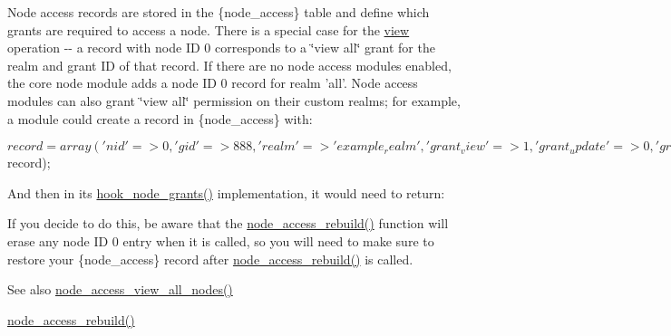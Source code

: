 Node access records are stored in the \{node\_\-access\} table and define which grants are required to access a node. There is a special case for the \hyperlink{classview}{view} operation -\/-\/ a record with node ID 0 corresponds to a \char`\"{}view all\char`\"{} grant for the realm and grant ID of that record. If there are no node access modules enabled, the core node module adds a node ID 0 record for realm 'all'. Node access modules can also grant \char`\"{}view all\char`\"{} permission on their custom realms; for example, a module could create a record in \{node\_\-access\} with: 
\begin{DoxyCode}
 $record = array(
   'nid' => 0,
   'gid' => 888,
   'realm' => 'example_realm',
   'grant_view' => 1,
   'grant_update' => 0,
   'grant_delete' => 0,
 );
 drupal_write_record('node_access', $record);
\end{DoxyCode}
 And then in its \hyperlink{group__node__access_gaa973f2ab6ab14c3fa14e5138c6d69ecf}{hook\_\-node\_\-grants()} implementation, it would need to return: 
 If you decide to do this, be aware that the \hyperlink{group__node__access_gaf04007aedfc3afbe074b2fe4065ab618}{node\_\-access\_\-rebuild()} function will erase any node ID 0 entry when it is called, so you will need to make sure to restore your \{node\_\-access\} record after \hyperlink{group__node__access_gaf04007aedfc3afbe074b2fe4065ab618}{node\_\-access\_\-rebuild()} is called.

\begin{DoxySeeAlso}{See also}
\hyperlink{group__node__access_gafb79200147d5087ceb32cb6b0632afd4}{node\_\-access\_\-view\_\-all\_\-nodes()} 

\hyperlink{group__node__access_gaf04007aedfc3afbe074b2fe4065ab618}{node\_\-access\_\-rebuild()}
\end{DoxySeeAlso}

